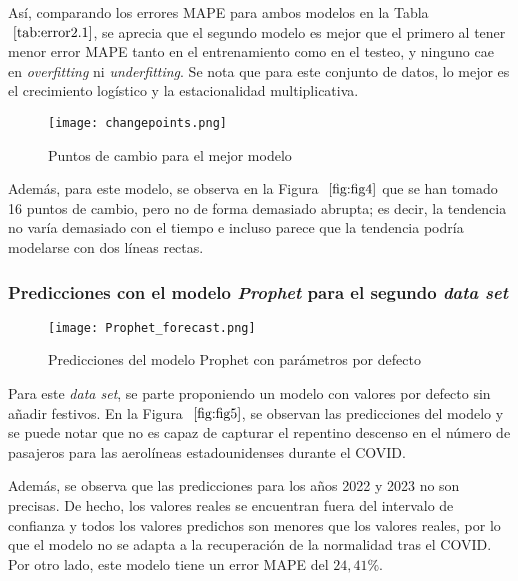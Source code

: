 \documentclass[12pt,twoside]{article}
\begin{document}
Así, comparando los errores MAPE para ambos modelos en la Tabla $~\ref{tab:error2.1}$, se aprecia que el segundo modelo es mejor que el primero al tener menor error MAPE tanto en el entrenamiento como en el testeo, y ninguno cae en \textit{overfitting} ni \textit{underfitting}. Se nota que para este conjunto de datos, lo mejor es el crecimiento logístico y la estacionalidad multiplicativa.

\begin{figure}[h]
    \centering
    \texttt{[image: changepoints.png]}
    \caption{Puntos de cambio para el mejor modelo} 
    \label{fig:fig4}
\end{figure}

Además, para este modelo, se observa en la Figura $~\ref{fig:fig4}$ que se han tomado 16 puntos de cambio, pero no de forma demasiado abrupta; es decir, la tendencia no varía demasiado con el tiempo e incluso parece que la tendencia podría modelarse con dos líneas rectas. 

\subsubsection{Predicciones con el modelo \textit{Prophet} para el segundo \textit{data set}}\label{sec:9}

\begin{figure}[h]
    \centering
    \texttt{[image: Prophet\_forecast.png]}
    \caption{Predicciones del modelo Prophet con parámetros por defecto} 
    \label{fig:fig5}
\end{figure}

Para este \textit{data set}, se parte proponiendo un modelo con valores por defecto sin añadir festivos. En la Figura $~\ref{fig:fig5}$, se observan las predicciones del modelo y se puede notar que no es capaz de capturar el repentino descenso en el número de pasajeros para las aerolíneas estadounidenses durante el COVID.


Además, se observa que las predicciones para los años 2022 y 2023 no son precisas. De hecho, los valores reales se encuentran fuera del intervalo de confianza y todos los valores predichos son menores que los valores reales, por lo que el modelo no se adapta a la recuperación de la normalidad tras el COVID. Por otro lado, este modelo tiene un error MAPE del $24,41\%$.
\end{document}
